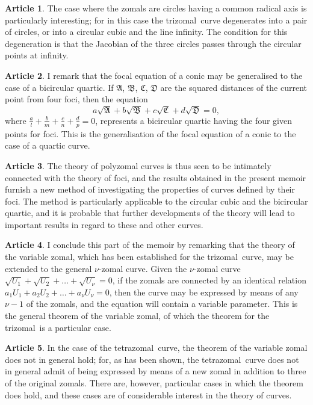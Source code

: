 \documentclass[11pt,a4paper]{article}
\theoremstyle{definition}
\newtheorem{art}{Article}
\newcommand{\trizomal}{trizomal}
\newcommand{\tetrazomal}{tetrazomal}
\begin{document}
\begin{art}
The case where the zomals are circles having a common radical axis is particularly interesting; for in this case the \trizomal\ curve degenerates into a pair of circles, or into a circular cubic and the line infinity. The condition for this degeneration is that the Jacobian of the three circles passes through the circular points at infinity.
\end{art}

\begin{art}
I remark that the focal equation of a conic may be generalised to the case of a bicircular quartic. If $\mathfrak{A}$, $\mathfrak{B}$, $\mathfrak{C}$, $\mathfrak{D}$ are the squared distances of the current point from four foci, then the equation
\[
a\sqrt{\mathfrak{A}} + b\sqrt{\mathfrak{B}} + c\sqrt{\mathfrak{C}} + d\sqrt{\mathfrak{D}} = 0,
\]
where $\tfrac{a}{l} + \tfrac{b}{m} + \tfrac{c}{n} + \tfrac{d}{p} = 0$, represents a bicircular quartic having the four given points for foci. This is the generalisation of the focal equation of a conic to the case of a quartic curve.
\end{art}

\begin{art}
The theory of polyzomal curves is thus seen to be intimately connected with the theory of foci, and the results obtained in the present memoir furnish a new method of investigating the properties of curves defined by their foci. The method is particularly applicable to the circular cubic and the bicircular quartic, and it is probable that further developments of the theory will lead to important results in regard to these and other curves.
\end{art}

\begin{art}
I conclude this part of the memoir by remarking that the theory of the variable zomal, which has been established for the \trizomal\ curve, may be extended to the general $\nu$-zomal curve. Given the $\nu$-zomal curve $\sqrt{U_{1}} + \sqrt{U_{2}} + \ldots + \sqrt{U_{\nu}} = 0$, if the zomals are connected by an identical relation $a_{1}U_{1} + a_{2}U_{2} + \ldots + a_{\nu}U_{\nu} = 0$, then the curve may be expressed by means of any $\nu - 1$ of the zomals, and the equation will contain a variable parameter. This is the general theorem of the variable zomal, of which the theorem for the \trizomal\ is a particular case.
\end{art}

\begin{art}
In the case of the \tetrazomal\ curve, the theorem of the variable zomal does not in general hold; for, as has been shown, the \tetrazomal\ curve does not in general admit of being expressed by means of a new zomal in addition to three of the original zomals. There are, however, particular cases in which the theorem does hold, and these cases are of considerable interest in the theory of curves.
\end{art}
\end{document}
